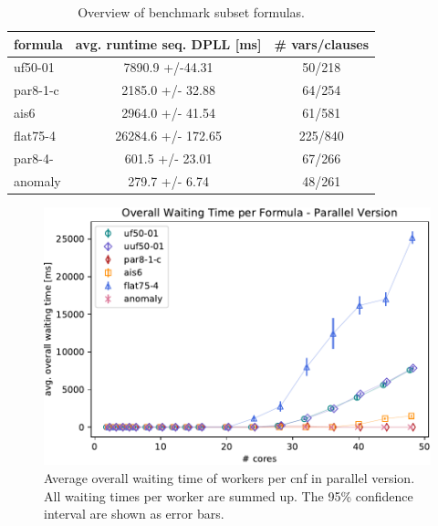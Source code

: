 \documentclass[letterpaper]{article}
\begin{document}
\begin{table}
    \centering
    \begin{tabular}{|l|c|c|}
        \hline
        formula & avg. runtime seq. DPLL [ms] & \# vars/clauses \\
        \hline
        \hline
        uf50-01 & 7890.9 +/-44.31 & 50/218\\
        \hline
        par8-1-c & 2185.0 +/- 32.88 & 64/254\\
        \hline
        ais6 &  2964.0 +/- 41.54 & 61/581\\
        \hline
        flat75-4 & 26284.6 +/- 172.65 & 225/840\\
        \hline
        par8-4- & 601.5 +/- 23.01 & 67/266\\
        \hline
        anomaly & 279.7 +/- 6.74 & 48/261\\
        \hline
    \end{tabular}
    \caption{Overview of benchmark subset formulas.}
    \label{tab:cnfs_parallel}
\end{table}

\begin{figure}
    \centering
    \includegraphics[width=\columnwidth]{figures/waiting_parallel_subset_dpll_scaling_tar.pdf}
    \caption{Average overall waiting time of workers per cnf in parallel version.
    All waiting times per worker are summed up.
    The 95\% confidence interval are shown as error bars.}
    \label{fig:dpll_parallel_waiting}
\end{figure}
\end{document}
